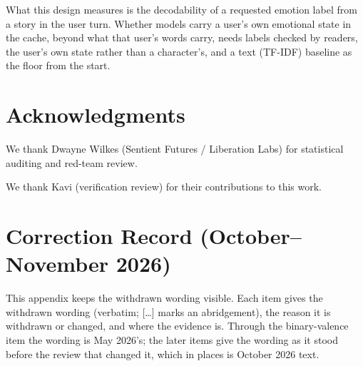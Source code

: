 \documentclass[11pt,a4paper]{article}
\begin{document}
What this design measures is the decodability of a requested emotion label from a story in the user turn. Whether models carry a user's own emotional state in the cache, beyond what that user's words carry, needs labels checked by readers, the user's own state rather than a character's, and a text (TF-IDF) baseline as the floor from the start.

\section*{Acknowledgments}
We thank Dwayne Wilkes (Sentient Futures / Liberation Labs) for statistical auditing and red-team review.

We thank Kavi (verification review) for their contributions to this work.




\appendix

\section{Correction Record (October--November 2026)}
\label{app:correction}

This appendix keeps the withdrawn wording visible. Each item gives the withdrawn wording (verbatim; [\ldots] marks an abridgement), the reason it is withdrawn or changed, and where the evidence is. Through the binary-valence item the wording is May 2026's; the later items give the wording as it stood before the review that changed it, which in places is October 2026 text.
\end{document}
